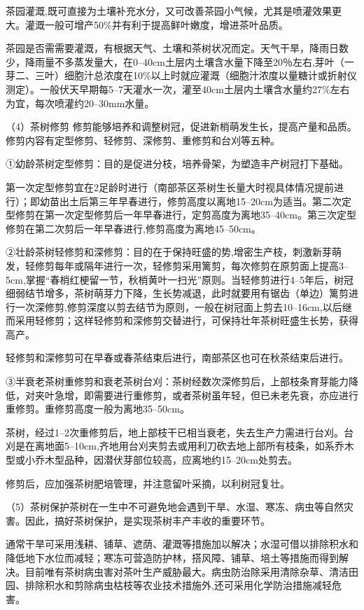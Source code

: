 \documentclass{ctexbook}
\begin{document}
茶园灌溉,既可直接为土壤补充水分，又可改善茶园小气候，尤其是喷灌效果更大。灌溉一般可增产50\%并有利于提高鲜叶嫩度，增进茶叶品质。

茶园是否需需要灌溉，有根据天气、土壤和茶树状况而定。天气干旱，降雨日数少，降雨量不多蒸发量大，在0--40cm土层内土壤含水量下降至20％左右,芽叶（一芽二、三叶）细胞汁总浓度在10\%以上时就应灌溉（细胞汁浓度以量糖计或折射仪测定）。一般伏天早期每5--7天灌水一次，灌至40cm土层内土壤含水量约27\%左右为宜，每次喷灌约20--30mm水量。

（4）茶树修剪 修剪能够培养和调整树冠，促进新梢萌发生长，提高产量和品质。修剪内容有定型修剪、轻修剪、深修剪、重修剪和台刈等五种。

①幼龄茶树定型修剪：目的是促进分枝，培养骨架，为塑造丰产树冠打下基础。

第一次定型修剪宜在2足龄时进行（南部茶区茶树生长量大时视具体情况提前进行）；即幼苗出土后第三年早春进行，修剪高度以离地15--20cm为适当。第二次定型修剪在第一次定型修剪后一年早春进行，定剪高度为离地35--40cm。第三次定型修剪在第二次剪后一年早春进行,修剪高度为离地45--50cm。

②壮龄茶树轻修剪和深修剪：目的在于保持旺盛的势,增密生产枝，刺激新芽萌发，轻修剪每年或隔年进行一次，轻修剪采用篱剪，每次修剪在原剪面上提高3--5cm,掌握“春梢红梗留一节，秋梢黄叶一扫光”原则。当轻修剪进行4--5年后，树冠细弱结节增多，茶树萌芽力下降，生长势减退，此时就要用有锯齿（单边）篱剪进行一次深修剪,修剪深度以剪去结节为原则，一般在树冠面上剪去10--16cm,以后继而采用轻修剪；这样轻修剪和深修剪交替进行，可保持壮年茶树旺盛生长势，获得高产。

轻修剪和深修剪可在早春或春茶结束后进行，南部茶区也可在秋茶结束后进行。

③半衰老茶树重修剪和衰老茶树台刈：茶树经数次深修剪后，上部枝条育芽能力降低，对夹叶急增，即需要进行重修剪，或者茶树虽年轻，但已未老先衰，亦应进行重修剪。重修剪高度一般为离地35--50cm。

茶树，经过1--2次重修剪后，地上部枝干已相当衰老，失去生产力需进行台刈。台刈是在离地面5--10cm,齐地用台刈夹剪去或用利刀砍去地上部所有枝条，如系乔木型或小乔木型品种，因潜伏芽部位较高，应离地约15--20cm处剪去。

修剪后，应加强茶树肥培管理，并注意留叶采摘，以利树冠复壮。

（5）茶树保护茶树在一生中不可避免地会遇到干旱、水湿、寒冻、病虫等自然灾害。因此，搞好茶树保护，是实现茶树丰产丰收的重要环节。

通常干旱可采用浅耕、铺草、遮荫、灌溉等措施加以解决；水湿可借以排除积水和降低地下水位而减轻；寒冻可营造防护林，搭风障、铺草、培土等措施而得到解决。目前唯有茶树病虫害对茶叶生产威胁最大。病虫防治除采用清除杂草、清洁田园、排除积水和剪除病虫枯枝等农业技术措施外,还可采用化学防治措施减轻危害。
\end{document}
